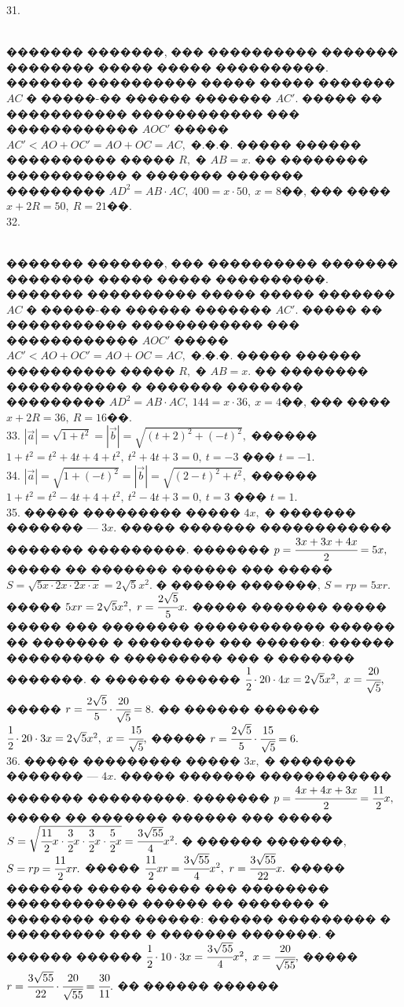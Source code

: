 \documentclass[12pt]{article}
\begin{document}
31. \begin{figure}[ht!]
\end{figure}\\
������� �������, ��� ���������� ������� �������� ����� ����� ����������. ������� ���������� ����� ����� ������� $AC$ � �����-�� ������ ������� $AC'.$ ����� �� ����������� ������������ ��� ������������ $AOC'$ ����� $AC'<AO+OC'=AO+OC=AC,$ �.�.�. ����� ������ ���������� ����� $R,$ � $AB=x.$ �� �������� ����������� � �������
������� ��������� $AD^2=AB\cdot AC,\ 400=x\cdot 50,\ x=8$��, ��� ���� $x+2R=50,\ R=21$��.\\
32. \begin{figure}[ht!]
\end{figure}\\
������� �������, ��� ���������� ������� �������� ����� ����� ����������. ������� ���������� ����� ����� ������� $AC$ � �����-�� ������ ������� $AC'.$ ����� �� ����������� ������������ ��� ������������ $AOC'$ ����� $AC'<AO+OC'=AO+OC=AC,$ �.�.�. ����� ������ ���������� ����� $R,$ � $AB=x.$ �� �������� ����������� � �������
������� ��������� $AD^2=AB\cdot AC,\ 144=x\cdot 36,\ x=4$��, ��� ���� $x+2R=36,\ R=16$��.\\
33. $|\vec{a}|=\sqrt{1+t^2}=|\vec{b}|=\sqrt{(t+2)^2+(-t)^2},$ ������ $1+t^2=t^2+4t+4+t^2,\ t^2+4t+3=0,\ t=-3$ ��� $t=-1.$\\
34. $|\vec{a}|=\sqrt{1+(-t)^2}=|\vec{b}|=\sqrt{(2-t)^2+t^2},$ ������ $1+t^2=t^2-4t+4+t^2,\ t^2-4t+3=0,\ t=3$ ��� $t=1.$\\
35. ����� ��������� ����� $4x,$ � ������� ������� --- $3x.$ ����� ������� ������������ ������� ���������. ������� $p=\cfrac{3x+3x+4x}{2}=5x,$ ����� �� ������� ������ ��� ����� \\$S=\sqrt{5x\cdot2x\cdot 2x\cdot x}=2\sqrt{5}x^2.$ � ������ �������, $S=rp=5xr.$ ����� $5xr=2\sqrt{5}x^2,\ r=\cfrac{2\sqrt{5}}{5}x.$ ����� ������� ����� ����� ��� �������� ������������ ������ �� ������� � �������� ��� ������: ������ ��������� � ��������� ��� � ������� �������. � ������ ������ $\cfrac{1}{2}\cdot20\cdot4x=2\sqrt{5}x^2,\ x=\cfrac{20}{\sqrt{5}},$ ����� $r=\cfrac{2\sqrt{5}}{5}\cdot\cfrac{20}{\sqrt{5}}=8.$ �� ������ ������
$\cfrac{1}{2}\cdot20\cdot3x=2\sqrt{5}x^2,\ x=\cfrac{15}{\sqrt{5}},$ ����� $r=\cfrac{2\sqrt{5}}{5}\cdot\cfrac{15}{\sqrt{5}}=6.$\\
36. ����� ��������� ����� $3x,$ � ������� ������� --- $4x.$ ����� ������� ������������ ������� ���������. ������� $p=\cfrac{4x+4x+3x}{2}=\cfrac{11}{2}x,$ ����� �� ������� ������ ��� ����� \\$S=\sqrt{\cfrac{11}{2}x\cdot\cfrac{3}{2}x\cdot \cfrac{3}{2}x\cdot \cfrac{5}{2}x}=\cfrac{3\sqrt{55}}{4}x^2.$ � ������ �������, $S=rp=\cfrac{11}{2}xr.$ ����� $\cfrac{11}{2}xr=\cfrac{3\sqrt{55}}{4}x^2,\ r=\cfrac{3\sqrt{55}}{22}x.$ ����� ������� ����� ����� ��� �������� ������������ ������ �� ������� � �������� ��� ������: ������ ��������� � ��������� ��� � ������� �������. � ������ ������ $\cfrac{1}{2}\cdot10\cdot3x=\cfrac{3\sqrt{55}}{4}x^2,\ x=\cfrac{20}{\sqrt{55}},$ ����� $r=\cfrac{3\sqrt{55}}{22}\cdot\cfrac{20}{\sqrt{55}}=\cfrac{30}{11}.$ �� ������ ������
\end{document}
